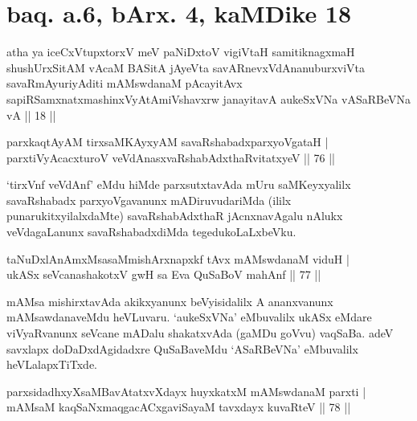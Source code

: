 \section*{baq. a.6, bArx. 4, kaMDike 18}

\begin{shl}
atha ya iceCxVtupxtorxV meV paNiDxtoV vigiVtaH samitiknagxmaH shushUrxSitAM vAcaM BASitA jAyeVta savARnevxVdAnanuburxviVta savaRmAyuriyAditi mAMswdanaM pAcayitAvx sapiRSamxnatxmashinxVyAtAmiVshavxrw janayitavA aukeSxVNa vASaRBeVNa vA || 18 ||
\end{shl}


\begin{shl}
parxkaqtAyAM tirxsaMKAyxyAM savaRshabadxparxyoVgataH | \\
parxtiVyAcacxturoV veVdAnasxvaRshabAdxthaRvitatxyeV \hfill|| 76 || 
\end{shl}

\begin{artha}
`tirxVnf veVdAnf' eMdu hiMde parxsutxtavAda mUru saMKeyxyalilx savaRshabadx parxyoVgavanunx mADiruvudariMda (ililx punarukitxyilalxdaMte) savaRshabAdxthaR jAcnxnavAgalu nAlukx veVdagaLanunx savaRshabadxdiMda tegedukoLaLxbeVku.
\end{artha}


\begin{shl}
taNuDxlAnAmxMsasaMmishArxnapxkf tAvx mAMswdanaM viduH | \\
ukASx seVcanashakotxV gwH sa Eva QuSaBoV mahAnf \hfill|| 77 || 
\end{shl}

\begin{artha}
mAMsa mishirxtavAda akikxyanunx beVyisidalilx A ananxvanunx 
mAMsawdanaveMdu heVLuvaru. `aukeSxVNa' eMbuvalilx ukASx eMdare 
viVyaRvanunx seVcane mADalu shakatxvAda (gaMDu goVvu) vaqSaBa. adeV 
savxlapx doDaDxdAgidadxre QuSaBaveMdu `ASaRBeVNa' eMbuvalilx 
heVLalapxTiTxde.
\end{artha}


\begin{shl}
parxsidadhxyXsaMBavAtatxvXdayx huyxkatxM mAMswdanaM parxti | \\
mAMsaM kaqSaNxmaqgacACxgaviSayaM tavxdayx kuvaRteV \hfill|| 78 || 
\end{shl}

